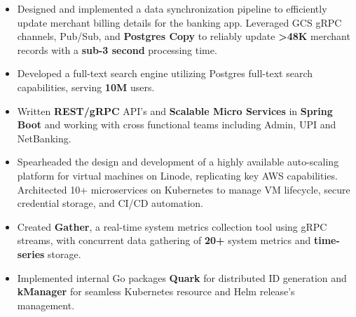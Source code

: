 \documentclass[10pt,a4paper,ragged2e]{classes/altacv}
\begin{document}
\tagline{ }

\begin{fullwidth}
\makecvheader
\end{fullwidth}






\begin{itemize}[itemsep=6pt]

\normalsize

\item Designed and implemented a data synchronization pipeline to efficiently update merchant billing details for the banking app. Leveraged GCS gRPC channels, Pub/Sub, and \textbf{Postgres Copy} to reliably update \textbf{>48K} merchant records with a \textbf{sub-3 second} processing time.

\item Developed a full-text search engine utilizing Postgres full-text search capabilities, serving \textbf{10M} users. 

\item Written \textbf{REST/gRPC} API's and \textbf{Scalable Micro Services} in \textbf{Spring Boot} and working with cross functional teams including Admin, UPI and NetBanking.

\end{itemize}
\vspace{6pt}

\begin{itemize}[itemsep=6pt]
\normalsize

\item Spearheaded the design and development of a highly available auto-scaling platform for virtual machines on Linode, replicating key AWS capabilities. Architected 10+ microservices on Kubernetes to manage VM lifecycle, secure credential storage, and CI/CD automation.

\item Created \textbf{Gather}, a real-time system metrics collection tool using gRPC streams, with concurrent data gathering of \textbf{20+} system metrics and \textbf{time-series} storage.

\item Implemented internal Go packages \textbf{Quark} for distributed ID generation and \textbf{kManager} for seamless Kubernetes resource and Helm release's management.

\end{itemize}
\vspace{6pt}
\end{document}
